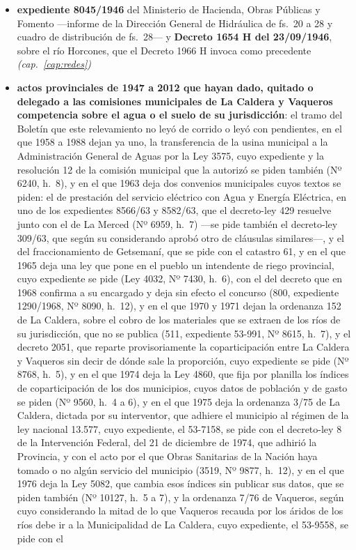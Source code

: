 \begin{itemize}[leftmargin=*]
propio ítem---; expedientes 1164 C, 1165 C y 1168 C del registro minero y límites de superficie
por solicitante en el Código de Minería de la época; liquidación de Levilly y Compañía y
resultado del remate de la fundición; y resultado del remate de Potrero del Gallinato de
1922 \textit{(cap.\ \ref{cap:siglo})}
\item \textbf{expediente 8045/1946} del Ministerio de Hacienda, Obras Públicas y Fomento ---informe de la Dirección General de Hidráulica de fs.\ 20 a 28 y cuadro de distribución de fs.\ 28--- y \textbf{Decreto 1654 H del 23/09/1946}, sobre el río Horcones, que el Decreto 1966 H invoca como precedente \textit{(cap.\ \ref{cap:redes})}
\item \textbf{actos provinciales de 1947 a 2012 que hayan dado, quitado o delegado a las comisiones municipales de La Caldera y Vaqueros competencia sobre el agua o el suelo de su jurisdicción}: el tramo del Boletín que este relevamiento no leyó de corrido o leyó con pendientes, en el que 1958 a 1988 dejan ya uno, la transferencia de la usina municipal a la Administración General de Aguas por la Ley 3575, cuyo expediente y la resolución 12 de la comisión municipal que la autorizó se piden también (Nº 6240, h.\ 8), y en el que 1963 deja dos convenios municipales cuyos textos se piden: el de prestación del servicio eléctrico con Agua y Energía Eléctrica, en uno de los expedientes 8566/63 y 8582/63, que el decreto-ley 429 resuelve junto con el de La Merced (Nº 6959, h.\ 7) ---se pide también el decreto-ley 309/63, que según su considerando aprobó otro de cláusulas similares---, y el del fraccionamiento de Getsemaní, que se pide con el catastro 61, y en el que 1965 deja una ley que pone en el pueblo un intendente de riego provincial, cuyo expediente se pide (Ley 4032, Nº 7430, h.\ 6), con el del decreto que en 1968 confirma a su encargado y deja sin efecto el concurso (800, expediente 1290/1968, Nº 8090, h.\ 12), y en el que 1970 y 1971 dejan la ordenanza 152 de La Caldera, sobre el cobro de los materiales que se extraen de los ríos de su jurisdicción, que no se publica (511, expediente 53-991, Nº 8615, h.\ 7), y el decreto 2051, que reparte provisoriamente la coparticipación entre La Caldera y Vaqueros sin decir de dónde sale la proporción, cuyo expediente se pide (Nº 8768, h.\ 5), y en el que 1974 deja la Ley 4860, que fija por planilla los índices de coparticipación de los dos municipios, cuyos datos de población y de gasto se piden (Nº 9560, h.\ 4 a 6), y en el que 1975 deja la ordenanza 3/75 de La Caldera, dictada por su interventor, que adhiere el municipio al régimen de la ley nacional 13.577, cuyo expediente, el 53-7158, se pide con el decreto-ley 8 de la Intervención Federal, del 21 de diciembre de 1974, que adhirió la Provincia, y con el acto por el que Obras Sanitarias de la Nación haya tomado o no algún servicio del municipio (3519, Nº 9877, h.\ 12), y en el que 1976 deja la Ley 5082, que cambia esos índices sin publicar sus datos, que se piden también (Nº 10127, h.\ 5 a 7), y la ordenanza 7/76 de Vaqueros, según cuyo considerando la mitad de lo que Vaqueros recauda por los áridos de los ríos debe ir a la Municipalidad de La Caldera, cuyo expediente, el 53-9558, se pide con el 
\end{itemize}
